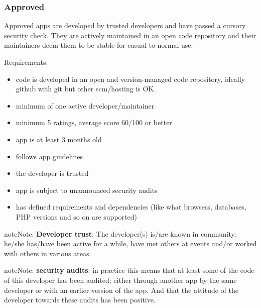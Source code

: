 \documentclass[letterpaper,10pt,english]{sphinxmanual}
\begin{document}
\subsubsection{Approved}
\label{app/publishing:approved}
Approved apps are developed by trusted developers and have passed a cursory security check. They are actively maintained in an open code repository and their maintainers deem them to be stable for casual to normal use.

Requirements:
\begin{itemize}
\item {} 
code is developed in an open and version-managed code repository, ideally github with git but other scm/hosting is OK.

\item {} 
minimum of one active developer/maintainer

\item {} 
minimum 5 ratings, average score 60/100 or better

\item {} 
app is at least 3 months old

\item {} 
follows app guidelines

\item {} 
the developer is trusted

\item {} 
app is subject to unannounced security audits

\item {} 
has defined requirements and dependencies (like what browsers, databases, PHP versions and so on are supported)

\end{itemize}

\begin{notice}{note}{Note:}
\textbf{Developer trust}: The developer(s) is/are known in community; he/she has/have been active for a while, have met others at events and/or worked with others in various areas.
\end{notice}

\begin{notice}{note}{Note:}
\textbf{security audits}: in practice this means that at least some of the code of this developer has been audited; either through another app by the same developer or with an earlier version of the app. And that the attitude of the developer towards these audits has been positive.
\end{notice}
\end{document}
